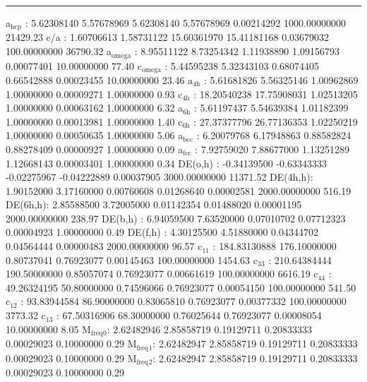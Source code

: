 \documentclass[11pt]{article}
\begin{document}
\noindent\rule{\textwidth}{0.5pt}
a\(_{\text{hcp}}\)   :   5.62308140   5.57678969   5.62308140   5.57678969   0.00214292 1000.00000000     21429.23
c/a     :   1.60706613   1.58731122  15.60361970  15.41181168   0.03679032 100.00000000     36790.32
a\(_{\text{omega}}\) :   8.95511122   8.73254342   1.11938890   1.09156793   0.00077401  10.00000000        77.40
c\(_{\text{omega}}\) :   5.44595238   5.32343103   0.68074405   0.66542888   0.00023455  10.00000000        23.46
a\(_{\text{4h}}\)    :   5.61681826   5.56325146   1.00962869   1.00000000   0.00009271   1.00000000         0.93
c\(_{\text{4h}}\)    :  18.20540238  17.75908031   1.02513205   1.00000000   0.00063162   1.00000000         6.32
a\(_{\text{6h}}\)    :   5.61197437   5.54639384   1.01182399   1.00000000   0.00013981   1.00000000         1.40
c\(_{\text{6h}}\)    :  27.37377796  26.77136353   1.02250219   1.00000000   0.00050635   1.00000000         5.06
a\(_{\text{bcc}}\)   :   6.20079768   6.17948863   0.88582824   0.88278409   0.00000927   1.00000000         0.09
a\(_{\text{fcc}}\)   :   7.92759020   7.88677000   1.13251289   1.12668143   0.00003401   1.00000000         0.34
DE(o,h) :  -0.34139500  -0.63343333  -0.02275967  -0.04222889   0.00037905 3000.00000000     11371.52
DE(4h,h):   1.90152000   3.17160000   0.00760608   0.01268640   0.00002581 2000.00000000       516.19
DE(6h,h):   2.85588500   3.72005000   0.01142354   0.01488020   0.00001195 2000.00000000       238.97
DE(b,h) :   6.94059500   7.63520000   0.07010702   0.07712323   0.00004923   1.00000000         0.49
DE(f,h) :   4.30125500   4.51880000   0.04344702   0.04564444   0.00000483 2000.00000000        96.57
c\(_{\text{11}}\)    : 184.83130888 176.10000000   0.80737041   0.76923077   0.00145463 100.00000000      1454.63
c\(_{\text{33}}\)    : 210.64384444 190.50000000   0.85057074   0.76923077   0.00661619 100.00000000      6616.19
c\(_{\text{44}}\)    :  49.26324195  50.80000000   0.74596066   0.76923077   0.00054150 100.00000000       541.50
c\(_{\text{12}}\)    :  93.83944584  86.90000000   0.83065810   0.76923077   0.00377332 100.00000000      3773.32
c\(_{\text{13}}\)    :  67.50316906  68.30000000   0.76025644   0.76923077   0.00008054  10.00000000         8.05
M\(_{\text{freq}}\)\(_{\text{0}}\):   2.62482946   2.85858719   0.19129711   0.20833333   0.00029023   0.10000000         0.29
M\(_{\text{freq}}\)\(_{\text{1}}\):   2.62482947   2.85858719   0.19129711   0.20833333   0.00029023   0.10000000         0.29
M\(_{\text{freq}}\)\(_{\text{2}}\):   2.62482947   2.85858719   0.19129711   0.20833333   0.00029023   0.10000000         0.29
\end{document}
